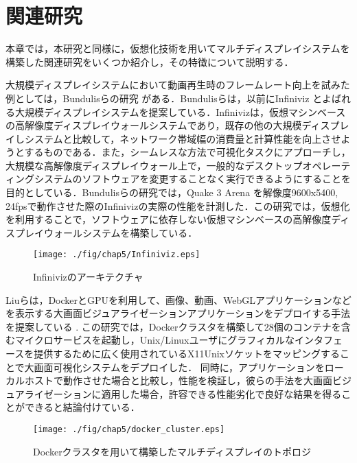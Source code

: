 \chapter{関連研究}

本章では，本研究と同様に，仮想化技術を用いてマルチディスプレイシステムを構築した関連研究をいくつか紹介し，その特徴について説明する．

大規模ディスプレイシステムにおいて動画再生時のフレームレート向上を試みた例としては，Bundulisらの研究 \cite{bundulis2018infiniviz}がある．Bundulisらは，以前にInfiniviz \cite{bundulis2016infiniviz}とよばれる大規模ディスプレイシステムを提案している．Infinivizは，仮想マシンベースの高解像度ディスプレイウォールシステムであり，既存の他の大規模ディスプレイしシステムと比較して，ネットワーク帯域幅の消費量と計算性能を向上させようとするものである．また，シームレスな方法で可視化タスクにアプローチし，大規模な高解像度ディスプレイウォール上で，一般的なデスクトップオペレーティングシステムのソフトウェアを変更することなく実行できるようにすることを目的としている．Bundulisらの研究では，Quake 3 Arena \cite{quake3arena}を解像度9600x5400, 24fpsで動作させた際のInfinivizの実際の性能を計測した．この研究では，仮想化を利用することで，ソフトウェアに依存しない仮想マシンベースの高解像度ディスプレイウォールシステムを構築している．

\begin{figure}[H]
    \hspace*{\fill}
    \texttt{[image: ./fig/chap5/Infiniviz.eps]}
    \hspace*{\fill}
    \caption{Infinivizのアーキテクチャ}
\end{figure}

\clearpage

Liuらは，DockerとGPUを利用して、画像、動画、WebGLアプリケーションなどを表示する大画面ビジュアライゼーションアプリケーションをデプロイする手法を提案している \cite{Liu_2019}.
この研究では，Dockerクラスタを構築して28個のコンテナを含むマイクロサービスを起動し，Unix/Linuxユーザにグラフィカルなインタフェースを提供するために広く使用されているX11Unixソケットをマッピングすることで大画面可視化システムをデプロイした．
同時に，アプリケーションをローカルホストで動作させた場合と比較し，性能を検証し，彼らの手法を大画面ビジュアライゼーションに適用した場合，許容できる性能劣化で良好な結果を得ることができると結論付けている．

\begin{figure}[H]
    \hspace*{\fill}
    \texttt{[image: ./fig/chap5/docker\_cluster.eps]}
    \hspace*{\fill}
    \caption{Dockerクラスタを用いて構築したマルチディスプレイのトポロジ}
\end{figure}